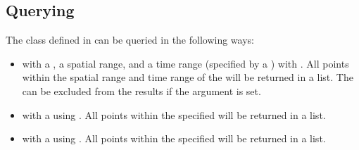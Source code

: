 \documentclass[letterpaper,10pt,english]{sphinxmanual}
\begin{document}
\subsection{Querying}
\label{\detokenize{octtree:querying}}
\sphinxAtStartPar
The  class defined in  can be queried in the following ways:
\begin{itemize}
\item {}
\sphinxAtStartPar
with a , a spatial range, and a time range (specified by a ) with
. All points within the spatial range and time range of the  will be
returned in a list. The  can be excluded from the results if the 
argument is set.

\item {}
\sphinxAtStartPar
with a  using . All points within the specified  will be returned in a list.

\item {}
\sphinxAtStartPar
with a  using . All points within the specified  will be returned in a list.

\end{itemize}
\end{document}
